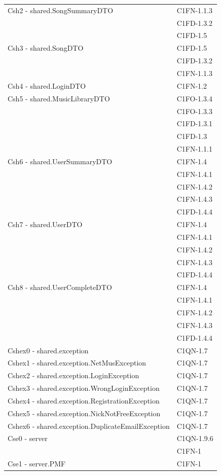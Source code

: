 \begin{footnotesize}
\begin{longtable}[!h]{|l|l|}
Csh2 - shared.SongSummaryDTO & C1FN-1.1.3 \\
& C1FD-1.3.2 \\
& C1FD-1.5 \\\hline
Csh3 - shared.SongDTO & C1FD-1.5 \\
& C1FD-1.3.2 \\
& C1FN-1.1.3 \\\hline
Csh4 - shared.LoginDTO & C1FN-1.2 \\\hline
Csh5 - shared.MusicLibraryDTO & C1FO-1.3.4 \\
& C1FO-1.3.3 \\
& C1FD-1.3.1 \\
& C1FD-1.3 \\
& C1FN-1.1.1 \\\hline
Csh6 - shared.UserSummaryDTO & C1FN-1.4 \\
& C1FN-1.4.1 \\
& C1FN-1.4.2 \\
& C1FN-1.4.3 \\
& C1FD-1.4.4 \\\hline
Csh7 - shared.UserDTO & C1FN-1.4 \\
& C1FN-1.4.1 \\
& C1FN-1.4.2 \\
& C1FN-1.4.3 \\
& C1FD-1.4.4 \\\hline
Csh8 - shared.UserCompleteDTO & C1FN-1.4 \\
& C1FN-1.4.1 \\
& C1FN-1.4.2 \\
& C1FN-1.4.3 \\
& C1FD-1.4.4 \\\hline
Cshex0 - shared.exception & C1QN-1.7 \\\hline
Cshex1 - shared.exception.NetMusException & C1QN-1.7 \\\hline
Cshex2 - shared.exception.LoginException & C1QN-1.7 \\\hline
Cshex3 - shared.exception.WrongLoginException & C1QN-1.7 \\\hline
Cshex4 - shared.exception.RegistrationException & C1QN-1.7 \\\hline
Cshex5 - shared.exception.NickNotFreeException & C1QN-1.7 \\\hline
Cshex6 - shared.exception.DuplicateEmailException & C1QN-1.7 \\\hline
Cse0 - server & C1QN-1.9.6 \\
&  C1FN-1 \\\hline
Cse1 - server.PMF & C1FN-1 \\\hline

\end{longtable}
\end{footnotesize}
